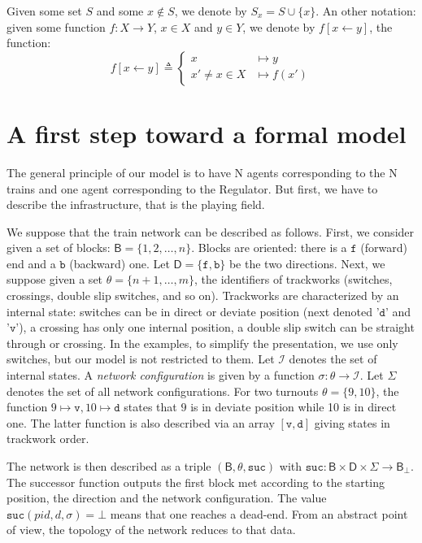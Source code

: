 \documentclass[runningheads]{llncs}
\newcommand{\directions}{{\mathsf{D}}}
\newcommand{\turnouts}{{\mathsf{\theta}}}
\newcommand{\blocks}{{\mathsf{B}}}
\newcommand{\internalState}{{\mathcal{I}}}
\newcommand{\forward}{{\mathtt{f}}}
\newcommand{\backward}{{\mathtt{b}}}
\newcommand{\sucblock}{{\mathtt{suc}}}
\newcommand{\deviate}{{\mbox{$\mathtt{v}$}}\xspace}
\newcommand{\direct}{{\mbox{$\mathtt{d}$}}\xspace}
\begin{document}
Given some set $S$ and some $x \not\in S$, we denote by $S_x = S \cup \{ x\}$.  An other notation: given some function $f: X \to Y$, $x \in X$ and $y \in Y$, we denote by $f[x \leftarrow y]$, the function:
 $$f[x \leftarrow y] \triangleq \left\{  \begin{array}{ll} x &\mapsto y\\
x' \neq x \in X &\mapsto f(x')
\end{array}\right.$$


\section{A first step toward a formal model}
\label{sec:informal-model}

The general principle of our model is to have N agents corresponding to the N trains and one agent corresponding to the Regulator. But first, we have to describe the infrastructure, that is  the playing field. 

We suppose that the train network can be described as follows. First, we consider given a set of blocks: $\blocks = \{ 1, 2, \ldots, n\}$. Blocks are oriented: there is a $\forward$ (forward) end and a $\backward$ (backward) one. Let $\directions = \{\forward, \backward\}$ be the two directions.  Next, we suppose given a set $\turnouts = \{ n+1, \ldots, m\}$, the identifiers  of trackworks (switches, crossings, double slip switches, and so on). Trackworks are characterized by an internal state: switches can be in direct or deviate position (next denoted '\direct' and '\deviate'),  a crossing has only one internal position, a double slip switch can be straight through or crossing. In the examples, to simplify the presentation, we use only switches, but our model is not restricted to them.  Let $\internalState$ denotes the set of internal states. A \emph{network configuration} is given by a function $\sigma: \turnouts \to \internalState$. Let $\Sigma$ denotes the set of all network configurations. For two turnouts $\theta = \{9, 10\}$, the function $9 \mapsto \deviate, 10 \mapsto \direct$ states that $9$ is in deviate position while 10 is in direct one. The latter function is also described via an array  $[\deviate, \direct]$ giving states in trackwork order. 

The network is then described as a triple $(\blocks, \turnouts, \sucblock)$ with $\sucblock: \blocks \times \directions \times \Sigma \to \blocks_\bot$. The successor function outputs the first block met according to the starting position, the direction and the network configuration.  The value $\sucblock(pid, d, \sigma) = \bot$ means that one reaches a dead-end. From an abstract point of view, the topology of the network reduces to that data.  
\end{document}
